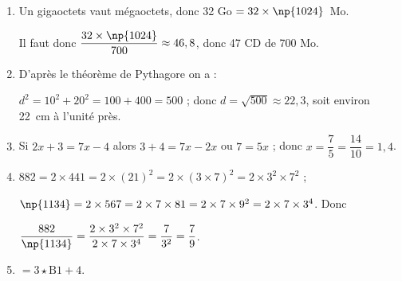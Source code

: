 \begin{enumerate}
\item Un gigaoctets vaut  mégaoctets, donc 32 Go $=  32 \times \np{1024}$~Mo.

Il faut donc $\dfrac{32 \times \np{1024}}{700}\approx 46,8$, donc 47 CD de 700 Mo.
\item D'après le théorème de Pythagore on a :

$d^2 = 10^2 + 20^2  = 100 + 400 = 500$ ; donc $d = \sqrt{500} \approx 22,3$, soit environ 22~cm à l'unité près.
\item Si $2x + 3 = 7x - 4$ alors $3 + 4 = 7x - 2x$ ou $7 = 5x$ ; donc $x = \dfrac{7}{5} = \dfrac{14}{10} = 1,4$.
\item $882 = 2 \times 441 = 2 \times (21)^2 = 2\times (3 \times 7)^2 = 2 \times 3^2 \times 7^2$ ;

$\np{1134} = 2 \times 567  = 2 \times 7 \times 81 = 2 \times 7 \times 9^2 = 2 \times 7 \times 3^4$. Donc 

$\dfrac{882}{\np{1134}} = \dfrac{2 \times 3^2 \times 7^2}{2 \times 7 \times 3^4} = \dfrac{7}{3^2} = \dfrac{7}{9}$.
\item $=3\star \text{B}1 + 4$.
\end{enumerate}

\bigskip

